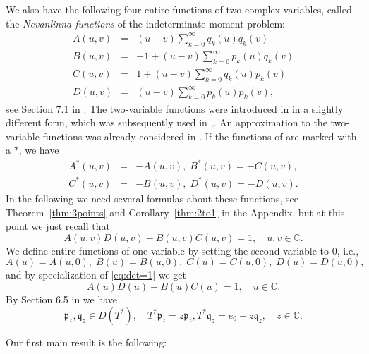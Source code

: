 \documentclass [12pt]{article}
\newcommand{\C}{\mathbb{C}}
\begin{document}
We also have the following four entire functions of two complex variables, called the {\it Nevanlinna functions} of the indeterminate moment problem:
\begin{eqnarray}
A(u,v)&=&(u-v)\sum_{k=0}^\infty q_k(u)q_k(v)\label{eq:A}\\
B(u,v)&=&-1+(u-v)\sum_{k=0}^\infty p_k(u)q_k(v) \label{eq:B}\\
C(u,v)&=&1+(u-v)\sum_{k=0}^\infty q_k(u)p_k(v)\label{eq:C}\\
D(u,v)&=&(u-v)\sum_{k=0}^\infty p_k(u)p_k(v)\label{eq:D},
\end{eqnarray}
see Section 7.1 in \cite{Sch}. The two-variable  functions were introduced in \cite{Bu:Ca} in a slightly different form, which was subsequently  used in \cite{B},\cite{Pe}. An approximation to the two-variable functions was already considered in \cite[p. 123]{Ak}.
If the functions of \cite{Bu:Ca} are marked with a $*$, we have
\begin{eqnarray*}\label{eq:A*-D*}
A^*(u,v)&=&-A(u,v),\; B^*(u,v)=-C(u,v),\\
C^*(u,v)&=&-B(u,v),\; D^*(u,v)=-D(u,v).
\end{eqnarray*} 
 In the following we need several formulas about these functions, see Theorem~\ref{thm:3points} and Corollary~\ref{thm:2to1} in the Appendix, but at this point we just recall that 
\begin{equation}\label{eq:det=1}
A(u,v)D(u,v)-B(u,v)C(u,v)=1,\quad u,v\in\C.
\end{equation}
We define entire functions of one variable by setting the second variable to 0, i.e., 
\begin{equation}\label{eq:A-D}
A(u)=A(u,0),\;B(u)=B(u,0),\;C(u)=C(u,0),\;D(u)=D(u,0),
\end{equation}
and by specialization of \eqref{eq:det=1} we get
\begin{equation}\label{eq:det=1*}
A(u)D(u)-B(u)C(u)=1,\quad u\in\C.
\end{equation}
By Section 6.5 in \cite{Sch} we have
\begin{equation}\label{eq:p,q}
\mathfrak{p}_z, \mathfrak{q}_z \in D(T^*),\quad T^*\mathfrak{p}_z=z\mathfrak{p}_z, 
T^*\mathfrak{q}_z=e_0+z\mathfrak{q}_z,\quad z\in\C.
\end{equation}

Our first main result is the following:
\end{document}
